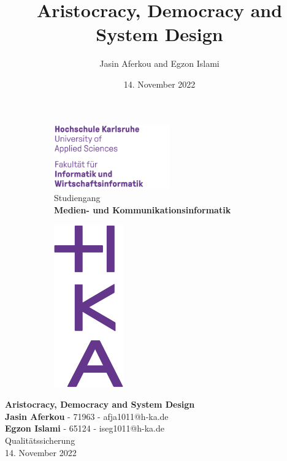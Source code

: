 \documentclass[a4paper, ngerman, 12pt, usenames, dvipsnames]{article}
\title{Aristocracy, Democracy and System Design}
\author{Jasin Aferkou and Egzon Islami}
\date{14. November 2022}
\begin{document}
\begin{titlepage}

    \begin{figure}[h]
        \begin{subfigure}[t]{10cm}
            \vskip 0pt
            \includegraphics[width=5cm,left]{images/HKA_IWI_Wortmarke_RGB.jpg}\\
            Studiengang\\
            \textbf{Medien- und Kommunikationsinformatik}\\
        \end{subfigure}
        \begin{subfigure}[t]{3cm}
            \vskip 0pt
            \includegraphics[width=3cm,right]{images/HKA_IWI_Bildmarke_RGB.jpg}
        \end{subfigure}
    \end{figure}
    \begin{center}
        \Large
        \vspace{1cm}
        \huge
        \textbf{Aristocracy, Democracy and System Design}\\
        \vspace{2cm}
        \normalsize
        \textbf{Jasin Aferkou} - 71963 - afja1011@h-ka.de\\
        \textbf{Egzon Islami} - 65124 - iseg1011@h-ka.de\\
        
        \vspace{2cm}
        Qualitätssicherung\\
        \vspace{1.5cm}
        \small
        14. November 2022
    \end{center}
\end{titlepage}
\pagebreak
\end{document}
